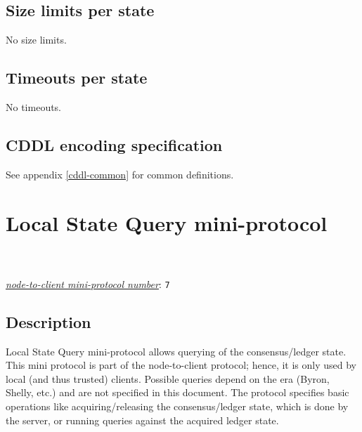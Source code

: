 \subsection{Size limits per state}

No size limits.

\subsection{Timeouts per state}

No timeouts.

\subsection{CDDL encoding specification}

See appendix \ref{cddl-common} for common definitions.

\section{Local State Query mini-protocol}
\label{local-state-query-protocol}
\\
\\
\hyperref[table:node-to-client-protocol-numbers]{\textit{node-to-client mini-protocol number}}: \texttt{7}\\
\newcommand{\StAcquiring}{\state{Acquiring}}
\newcommand{\StAcquired}{\state{Acquired}}
\newcommand{\StQuerying}{\state{Querying}}
\newcommand{\MsgAcquire}{\msg{MsgAcquire}}
\newcommand{\MsgAcquired}{\msg{MsgAcquired}}
\newcommand{\MsgFailure}{\msg{MsgFailure}}
\newcommand{\MsgQuery}{\msg{MsgQuery}}
\newcommand{\MsgResult}{\msg{MsgResult}}
\newcommand{\MsgRelease}{\msg{MsgRelease}}
\newcommand{\MsgReAcquire}{\msg{MsgReAcquire}}

\subsection{Description}
Local State Query mini-protocol allows querying of the consensus/ledger state.
This mini protocol is part of the node-to-client protocol; hence, it is only
used by local (and thus trusted) clients.  Possible queries depend on the era
(Byron, Shelly, etc.) and are not specified in this document.  The protocol
specifies basic operations like acquiring/releasing the consensus/ledger
state, which is done by the server, or running queries against the acquired
ledger state.

